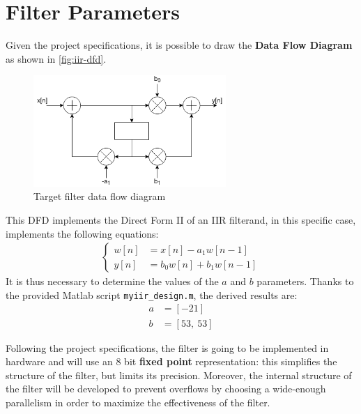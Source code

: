 \section{Filter Parameters}
Given the project specifications, it is possible to draw the \textbf{Data Flow Diagram} as shown in \autoref{fig:iir-dfd}.
\begin{figure}[htbp]
	\center
	\includegraphics[width=0.65\textwidth]{chapter1/images/iir-dfd.png}
	\caption{Target filter data flow diagram}
	\label{fig:iir-dfd}
\end{figure}

This DFD implements the Direct Form II of an IIR filterand, in this specific case, implements the following equations:
\begin{align}
	\begin{cases}
		w[n] &= x[n] - a_1 w[n-1] 		\\
		y[n] &= b_0 w[n] + b_1 w[n-1]
	\end{cases}
	\label{eqn:iir}
\end{align}
It is thus necessary to determine the values of the $a$ and $b$ parameters. Thanks to the provided Matlab script \texttt{myiir\_design.m}, the derived results are:
\begin{align}
    a &= [-21] \\
    b &= [53,\ 53]
\end{align}

Following the project specifications, the filter is going to be implemented in hardware and will use an 8 bit \textbf{fixed point} representation: this simplifies the structure of the filter, but limits its precision. Moreover, the internal structure of the filter will be developed to prevent overflows by choosing a wide-enough parallelism in order to maximize the effectiveness of the filter.

